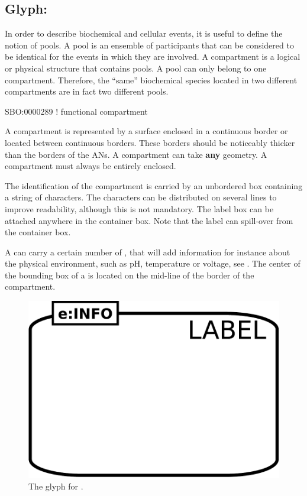 \subsection{Glyph: }\label{sec:compartment}

In order to describe biochemical and cellular events, it is useful to define the notion of pools. A pool is an ensemble of participants that  can be considered to be identical for the events in which they are involved. A compartment is a logical or physical structure that contains pools. A pool can only belong to one compartment. Therefore, the ``same'' biochemical species located in two different compartments are in fact two different pools.

\begin{glyphDescription}

\glyphSboTerm  SBO:0000289 ! functional compartment

\glyphContainer A compartment is represented by a surface enclosed in a continuous border or located between continuous borders. These borders should be noticeably thicker than the borders of the ANs. A compartment can take \textbf{any} geometry. A compartment must always be entirely enclosed.

\glyphLabel The identification of the compartment is carried by an unbordered box containing a string of characters. The characters can be distributed on several lines to improve readability, although this is not mandatory. The label box can be attached anywhere in the container box. Note that the label can spill-over from the container box.

\glyphAux A  can carry a certain number of , that will add information for instance about the physical environment, such as pH, temperature or voltage, see .  The center of the bounding box of a  is located on the mid-line of the border of the compartment.

\end{glyphDescription}

\begin{figure}[H]
  \centering
  \includegraphics[scale = 0.3]{images/compartment}
  \caption{The \AF glyph for .}
  \label{fig:af:compartment}
\end{figure}

